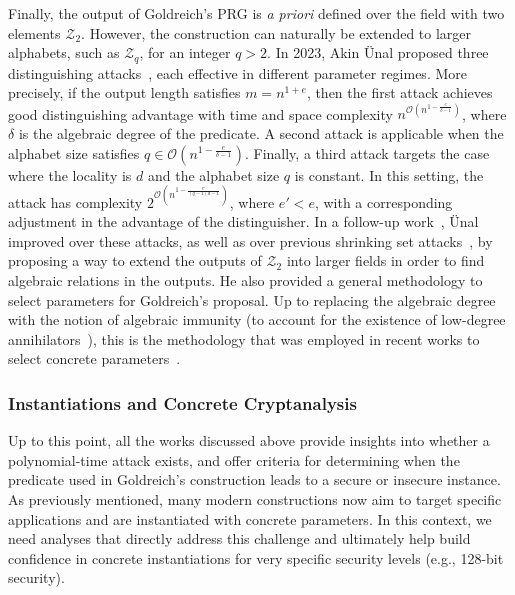 Finally, the output of Goldreich's PRG is \textit{a priori} defined over the field with two elements $\mathcal{Z}_2$. However, the construction can naturally be extended to larger alphabets, such as $\mathcal{Z}_q$, for an integer $q > 2$. In 2023, Akin Ünal proposed three distinguishing attacks~\cite{EC:Unal23}, each effective in different parameter regimes. More precisely, if the output length satisfies $m = n^{1+e}$, then the first attack achieves good distinguishing advantage with time and space complexity $n^{\mathcal{O}(n^{1 - \frac{e}{\delta - 1}})}$, where  $\delta$ is the algebraic degree of the predicate. A second attack is applicable when the alphabet size satisfies $q \in \mathcal{O}(n^{1 - \frac{e}{\delta - 1}})$. Finally, a third attack targets the case where the locality is $d$ and the alphabet size $q$ is constant. 
In this setting, the attack has complexity $2^{\mathcal{O}(n^{1 - \frac{e'}{(q - 1)d - 1}})}$, where $e' < e$, with a corresponding adjustment in the advantage of the distinguisher. In a follow-up work~\cite{EPRINT:Unal23b}, Ünal improved over these attacks, as well as over previous shrinking set attacks~\cite{applebaum2008pseudorandom,zichron2017locally}, by proposing a way to extend the outputs of $\mathcal{Z}_2$ into larger fields in order to find algebraic relations in the outputs. He also provided a general methodology to select parameters for Goldreich's proposal. Up to replacing the algebraic degree with the notion of algebraic immunity (to account for the existence of low-degree annihilators~\cite{STOC:AppLov16}), this is the methodology that was employed in recent works to select concrete parameters~\cite{EC:BCMPR24,AC:CDDKS24,DBLP:conf/eurocrypt/AgarwalBBS25}.




\subsubsection{Instantiations and Concrete Cryptanalysis}

Up to this point, all the works discussed above provide insights into whether a polynomial-time attack exists, and offer criteria for determining when the predicate used in Goldreich's construction leads to a secure or insecure instance. As previously mentioned, many modern constructions now aim to target specific applications and are instantiated with concrete parameters. In this context, we need analyses that directly address this challenge and ultimately help build confidence in concrete instantiations for very specific security levels (e.g., 128-bit security).

